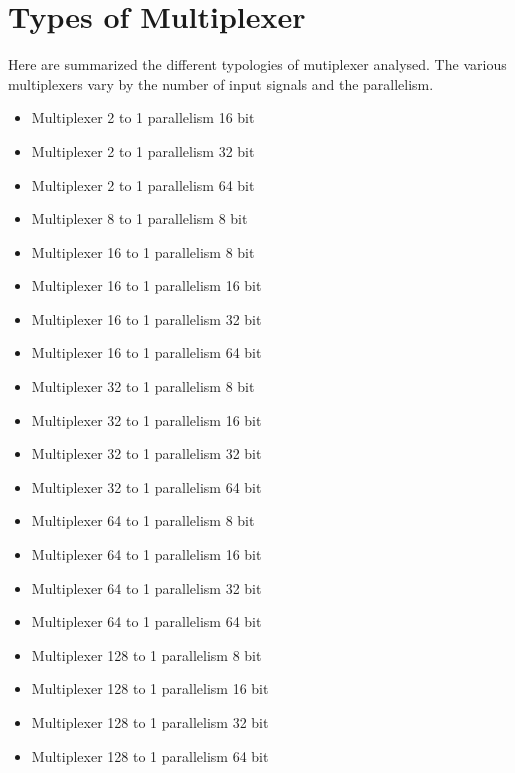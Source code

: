 \newpage
\section{Types of Multiplexer}
Here are summarized the different typologies of mutiplexer analysed. The various multiplexers vary by the number of input signals and the parallelism. 
\begin{itemize}\itemsep1pt
	\item Multiplexer 2 to 1 parallelism 16 bit
	\item Multiplexer 2 to 1 parallelism 32 bit
	\item Multiplexer 2 to 1 parallelism 64 bit 
	\item Multiplexer 8 to 1 parallelism 8 bit 	
	\item Multiplexer 16 to 1 parallelism 8 bit
	\item Multiplexer 16 to 1 parallelism 16 bit
	\item Multiplexer 16 to 1 parallelism 32 bit
	\item Multiplexer 16 to 1 parallelism 64 bit 
	\item Multiplexer 32 to 1 parallelism 8 bit
	\item Multiplexer 32 to 1 parallelism 16 bit
	\item Multiplexer 32 to 1 parallelism 32 bit
	\item Multiplexer 32 to 1 parallelism 64 bit 
	\item Multiplexer 64 to 1 parallelism 8 bit
	\item Multiplexer 64 to 1 parallelism 16 bit
	\item Multiplexer 64 to 1 parallelism 32 bit
	\item Multiplexer 64 to 1 parallelism 64 bit 
	\item Multiplexer 128 to 1 parallelism 8 bit
	\item Multiplexer 128 to 1 parallelism 16 bit
	\item Multiplexer 128 to 1 parallelism 32 bit
	\item Multiplexer 128 to 1 parallelism 64 bit 
\end{itemize}
\newpage
